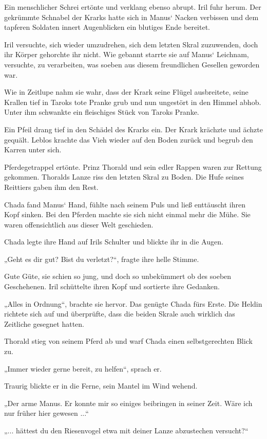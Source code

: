 Ein menschlicher Schrei ertönte und verklang ebenso abrupt. Iril fuhr herum. Der gekrümmte Schnabel der Krarks hatte sich in Manus‘ Nacken verbissen und dem tapferen Soldaten innert Augenblicken ein blutiges Ende bereitet.

Iril versuchte, sich wieder umzudrehen, sich dem letzten Skral zuzuwenden, doch ihr Körper gehorchte ihr nicht. Wie gebannt starrte sie auf Manus‘ Leichnam, versuchte, zu verarbeiten, was soeben aus diesem freundlichen Gesellen geworden war.

Wie in Zeitlupe nahm sie wahr, dass der Krark seine Flügel ausbreitete, seine Krallen tief in Taroks tote Pranke grub und nun ungestört in den Himmel abhob. Unter ihm schwankte ein fleischiges Stück von Taroks Pranke.

Ein Pfeil drang tief in den Schädel des Krarks ein. Der Krark krächzte und ächzte gequält. Leblos krachte das Vieh wieder auf den Boden zurück und begrub den Karren unter sich.

Pferdegetrappel ertönte. Prinz Thorald und sein edler Rappen waren zur Rettung gekommen. Thoralds Lanze riss den letzten Skral zu Boden. Die Hufe seines Reittiers gaben ihm den Rest.

Chada fand Manus‘ Hand, fühlte nach seinem Puls und ließ enttäuscht ihren Kopf sinken. Bei den Pferden machte sie sich nicht einmal mehr die Mühe. Sie waren offensichtlich aus dieser Welt geschieden.

Chada legte ihre Hand auf Irils Schulter und blickte ihr in die Augen.

„Geht es dir gut? Bist du verletzt?“, fragte ihre helle Stimme.

Gute Güte, sie schien so jung, und doch so unbekümmert ob des soeben Geschehenen. Iril schüttelte ihren Kopf und sortierte ihre Gedanken.

„Alles in Ordnung“, brachte sie hervor. Das genügte Chada fürs Erste. Die Heldin richtete sich auf und überprüfte, dass die beiden Skrale auch wirklich das Zeitliche gesegnet hatten.

Thorald stieg von seinem Pferd ab und warf Chada einen selbstgerechten Blick zu.

„Immer wieder gerne bereit, zu helfen“, sprach er.

Traurig blickte er in die Ferne, sein Mantel im Wind wehend.

„Der arme Manus. Er konnte mir so einiges beibringen in seiner Zeit. Wäre ich nur früher hier gewesen ...“

„... hättest du den Riesenvogel etwa mit deiner Lanze abzustechen versucht?“

